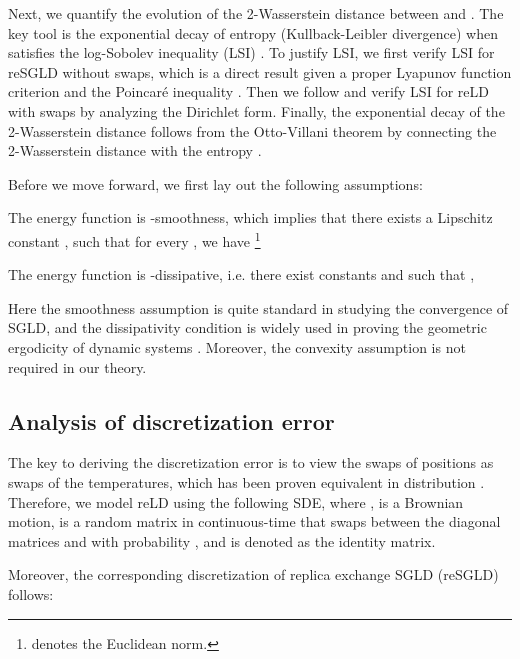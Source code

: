 Next, we quantify the evolution of the 2-Wasserstein distance between  and . The key tool is the exponential decay of entropy (Kullback-Leibler divergence) when  satisfies the log-Sobolev inequality (LSI) \citep{Bakry2014}. To justify LSI, we first verify LSI for reSGLD without swaps, which is a direct result given a proper Lyapunov function criterion \citep{Cattiaux2010} and the Poincar\'{e} inequality \citep{chen2018accelerating}. Then we follow \citet{chen2018accelerating} and verify LSI for reLD with swaps by analyzing the Dirichlet form. Finally, the exponential decay of the 2-Wasserstein distance follows from the Otto-Villani theorem by connecting the 2-Wasserstein distance with the entropy \citep{Bakry2014}. 


Before we move forward, we first lay out the following assumptions:
\begin{assumption}[Smoothness]\label{assump: lip and alpha beta}
The energy function  is -smoothness, which implies that there exists a Lipschitz constant , such that for every , we have  \footnote{ denotes the Euclidean  norm.}
\end{assumption}{}


\begin{assumption}[Dissipativity]\label{assump: dissipitive}
The energy function  is -dissipative, i.e. there exist constants  and  such that ,  
\end{assumption}{}

Here the smoothness assumption is quite standard in studying the convergence of SGLD, and the dissipativity condition is widely used in proving the geometric ergodicity of dynamic systems \citep{Maxim17, Xu18}. Moreover, the convexity assumption is not required in our theory.



\subsection{Analysis of discretization error}

The key to deriving the discretization error is to view the swaps of positions as swaps of the temperatures, which has been proven equivalent in distribution \citep{Paul12}. Therefore, we model reLD using the following SDE, 
{}
where  ,  is a Brownian motion,  is a random matrix in continuous-time that swaps between the diagonal matrices  and  with probability , and  is denoted as the identity matrix.

Moreover, the corresponding discretization of replica exchange SGLD (reSGLD) follows:

